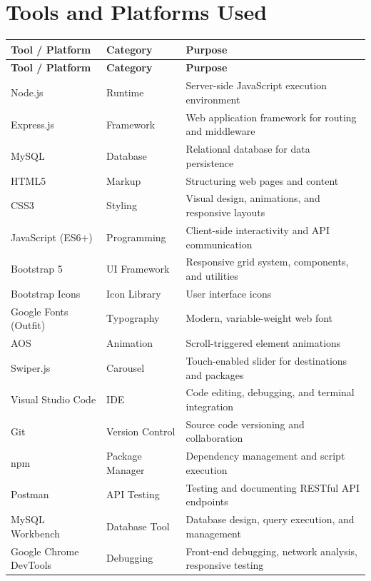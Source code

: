 \section{Tools and Platforms Used}

\begin{longtable}{|p{4cm}|p{3.5cm}|p{5.5cm}|}
\hline
\textbf{Tool / Platform} & \textbf{Category} & \textbf{Purpose} \\
\hline
\endfirsthead
\hline
\textbf{Tool / Platform} & \textbf{Category} & \textbf{Purpose} \\
\hline
\endhead
Node.js & Runtime & Server-side JavaScript execution environment \\
\hline
Express.js & Framework & Web application framework for routing and middleware \\
\hline
MySQL & Database & Relational database for data persistence \\
\hline
HTML5 & Markup & Structuring web pages and content \\
\hline
CSS3 & Styling & Visual design, animations, and responsive layouts \\
\hline
JavaScript (ES6+) & Programming & Client-side interactivity and API communication \\
\hline
Bootstrap 5 & UI Framework & Responsive grid system, components, and utilities \\
\hline
Bootstrap Icons & Icon Library & User interface icons \\
\hline
Google Fonts (Outfit) & Typography & Modern, variable-weight web font \\
\hline
AOS & Animation & Scroll-triggered element animations \\
\hline
Swiper.js & Carousel & Touch-enabled slider for destinations and packages \\
\hline
Visual Studio Code & IDE & Code editing, debugging, and terminal integration \\
\hline
Git & Version Control & Source code versioning and collaboration \\
\hline
npm & Package Manager & Dependency management and script execution \\
\hline
Postman & API Testing & Testing and documenting RESTful API endpoints \\
\hline
MySQL Workbench & Database Tool & Database design, query execution, and management \\
\hline
Google Chrome DevTools & Debugging & Front-end debugging, network analysis, responsive testing \\
\hline
\end{longtable}
